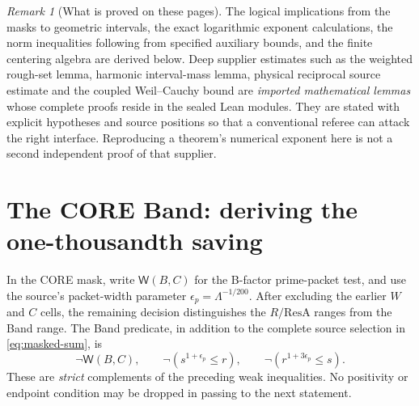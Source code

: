 \documentclass[11pt]{article}
\newcommand{\Lam}{\Lambda}
\newcommand{\epsp}{\epsilon_p}
\theoremstyle{definition}
\theoremstyle{remark}
\newtheorem{remark}[theorem]{Remark}
\newcommand{\1}{\mathbf 1}
\begin{document}
\begin{remark}[What is proved on these pages]\label{rem:standing}
The logical implications from the masks to geometric intervals,
the exact logarithmic exponent calculations, the norm inequalities
following from specified auxiliary bounds, and the finite
centering algebra are derived below. Deep supplier estimates such
as the weighted rough-set lemma, harmonic interval-mass lemma,
physical reciprocal source estimate and the coupled Weil--Cauchy
bound are \emph{imported mathematical lemmas} whose complete proofs
reside in the sealed Lean modules. They are stated with explicit
hypotheses and source positions so that a conventional referee can
attack the right interface. Reproducing a theorem's numerical
exponent here is not a second independent proof of that supplier.
\end{remark}

\section{The CORE Band: deriving the one-thousandth saving}\label{sec:band}

In the CORE mask, write $\mathsf W(B,C)$ for the B-factor
prime-packet test, and use the source's packet-width parameter
$\epsp=\Lam^{-1/200}$. After excluding the earlier $W$ and $C$
cells, the remaining decision distinguishes the $R/\mathrm{ResA}$
ranges from the Band range. The Band predicate, in addition to the
complete source selection in \eqref{eq:masked-sum}, is
\begin{equation}\label{eq:band-mask}
 \neg\mathsf W(B,C),\qquad
 \neg(s^{1+\epsp}\le r),\qquad
 \neg(r^{1+3\epsp}\le s).
\end{equation}
These are \emph{strict} complements of the preceding weak
inequalities. No positivity or endpoint condition may be dropped
in passing to the next statement.
\end{document}
